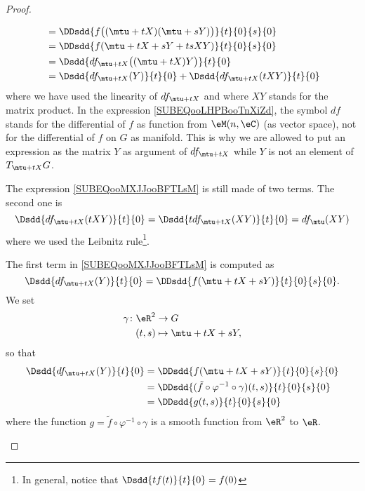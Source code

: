 \begin{proof}
\begin{subproof}
\begin{subequations}
\begin{align}
                    &=\DDsdd{ f\big( (\mtu+tX)(\mtu+sY) \big) }{t}{0}{s}{0}\\
                    &=\DDsdd{ f(\mtu+tX+sY+tsXY) }{t}{0}{s}{0}\\
                    &=\Dsdd{ df_{\mtu+tX}\big( (\mtu+tX)Y \big) }{t}{0} \label{SUBEQooLHPBooTnXiZd}\\
                    &=\Dsdd{ df_{\mtu+tX}(Y) }{t}{0}+\Dsdd{ df_{\mtu+tX}(tXY) }{t}{0}   \label{SUBEQooMXJJooBFTLsM}
                \end{align}
            \end{subequations}
            where we have used the linearity of \( df_{\mtu+tX}\) and where \( XY\) stands for the matrix product. In the expression \eqref{SUBEQooLHPBooTnXiZd}, the symbol \( df\) stands for the differential of \( f\) as function from \( \eM(n,\eC)\) (as vector space), not for the differential of \( f\) on \( G\) as manifold. This is why we are allowed to put an expression as the matrix \( Y\) as argument of \( df_{\mtu+tX}\) while \( Y\) is not an element of \( T_{\mtu+tX}G\).

            The expression \eqref{SUBEQooMXJJooBFTLsM} is still made of two terms. The second one is
            \begin{equation}
                \Dsdd{ df_{\mtu+tX}(tXY) }{t}{0}=\Dsdd{ tdf_{\mtu+tX}(XY) }{t}{0}=df_{\mtu}(XY)
            \end{equation}
            where we used the Leibnitz rule\footnote{In general, notice that \( \Dsdd{ tf(t) }{t}{0}=f(0)\)}.

            The first term in \eqref{SUBEQooMXJJooBFTLsM} is computed as
            \begin{equation}
                    \Dsdd{ df_{\mtu+tX}(Y) }{t}{0}=\DDsdd{ f(\mtu+tX+sY) }{t}{0}{s}{0}.
            \end{equation}
            We set 
            \begin{equation}
                \begin{aligned}
                    \gamma\colon \eR^2&\to G \\
                    (t,s)&\mapsto \mtu+tX+sY, 
                \end{aligned}
            \end{equation}
            so that
            \begin{subequations}
                \begin{align}
                    \Dsdd{ df_{\mtu+tX}(Y) }{t}{0}&=\DDsdd{ f(\mtu+tX+sY) }{t}{0}{s}{0}\\
                    &=\DDsdd{ (\tilde f\circ\varphi^{-1}\circ\gamma)(t,s) }{t}{0}{s}{0}\\
                    &=\DDsdd{ g(t,s) }{t}{0}{s}{0}
                \end{align}
            \end{subequations}
            where the function \( g=\tilde f\circ\varphi^{-1}\circ \gamma\) is a smooth function from \( \eR^2\) to \( \eR\).        


\end{subproof}
\end{proof}
